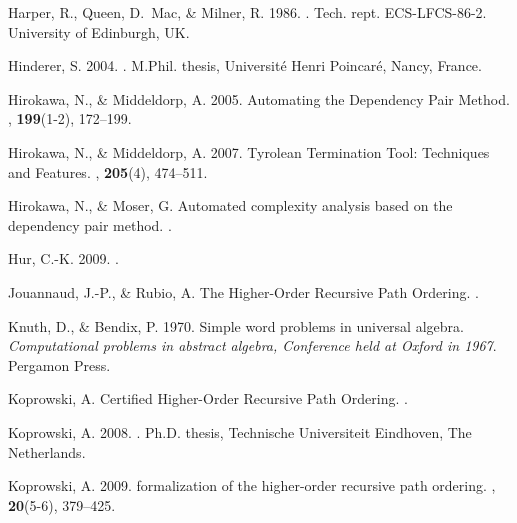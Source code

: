 \begin{thebibliography}{}
Harper, R., Queen, D.~Mac, \& Milner, R. 1986.
.
\newblock Tech. rept. ECS-LFCS-86-2. University of Edinburgh, UK.

Hinderer, S. 2004.
.
\newblock M.Phil. thesis, Universit\'e Henri Poincar\'e, Nancy, France.

Hirokawa, N., \& Middeldorp, A. 2005.
\newblock Automating the Dependency Pair Method.
, {\bf 199}(1-2), 172--199.

Hirokawa, N., \& Middeldorp, A. 2007.
\newblock Tyrolean {Termination} {Tool}: Techniques and Features.
, {\bf 205}(4), 474--511.

Hirokawa, N., \& Moser, G.
\newblock Automated complexity analysis based on the dependency pair method.
.

Hur, C.-K. 2009.
.


Jouannaud, J.-P., \& Rubio, A.
\newblock The Higher-Order Recursive Path Ordering.
.

Knuth, D., \& Bendix, P. 1970.
\newblock Simple word problems in universal algebra.
\newblock {} {\em Computational problems in abstract
  algebra,  Conference held at Oxford in 1967}.
\newblock Pergamon Press.

Koprowski, A.
\newblock Certified Higher-Order Recursive Path Ordering.
.

Koprowski, A. 2008.
.
\newblock Ph.D. thesis, Technische Universiteit Eindhoven, The Netherlands.

Koprowski, A. 2009.
 formalization of the higher-order recursive path ordering.
, {\bf 20}(5-6), 379--425.


\end{thebibliography}
